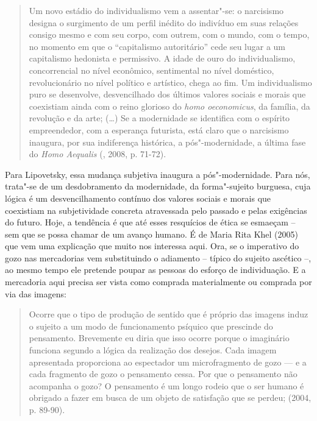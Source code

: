 \begin{quote}
Um novo estádio do individualismo vem a assentar"-se: o narcisismo
designa o surgimento de um perfil inédito do indivíduo em suas relações
consigo mesmo e com seu corpo, com outrem, com o mundo, com o tempo, no
momento em que o ``capitalismo autoritário'' cede seu lugar a um
capitalismo hedonista e permissivo. A idade de ouro do individualismo,
concorrencial no nível econômico, sentimental no nível doméstico,
revolucionário no nível político e artístico, chega ao fim. Um
individualismo puro se desenvolve, desvencilhado dos últimos valores
sociais e morais que coexistiam ainda com o reino glorioso do \emph{homo
oeconomicus}, da família, da revolução e da arte; (\ldots{}) Se a modernidade
se identifica com o espírito empreendedor, com a esperança futurista,
está claro que o narcisismo inaugura, por sua indiferença histórica, a
pós"-modernidade, a última fase do \emph{Homo Aequalis}
(, 2008, p. 71-72).
\end{quote}

Para Lipovetsky, essa mudança subjetiva inaugura a pós"-modernidade. Para
nós, trata"-se de um desdobramento da modernidade, da forma"-sujeito
burguesa, cuja lógica é um desvencilhamento contínuo dos valores sociais
e morais que coexistiam na subjetividade concreta atravessada pelo
passado e pelas exigências do futuro. Hoje, a tendência é que até esses
resquícios de ética se esmaeçam -- sem que se possa chamar de um avanço
humano. É de Maria Rita Khel (2005) que vem uma explicação que muito nos
interessa aqui. Ora, se o imperativo do gozo nas mercadorias vem
substituindo o adiamento -- típico do sujeito ascético --, ao mesmo
tempo ele pretende poupar as pessoas do esforço de individuação. E a
mercadoria aqui precisa ser vista como comprada materialmente ou
comprada por via das imagens:

\begin{quote}
Ocorre que o tipo de produção de sentido que é próprio das imagens induz
o sujeito a um modo de funcionamento psíquico que prescinde do
pensamento. Brevemente eu diria que isso ocorre porque o imaginário
funciona segundo a lógica da realização dos desejos. Cada imagem
apresentada proporciona ao espectador um microfragmento de gozo --- e a
cada fragmento de gozo o pensamento cessa. Por que o pensamento não
acompanha o gozo? O pensamento é um longo rodeio que o ser humano é
obrigado a fazer em busca de um objeto de satisfação que se perdeu;
(2004, p. 89-90).
\end{quote}


